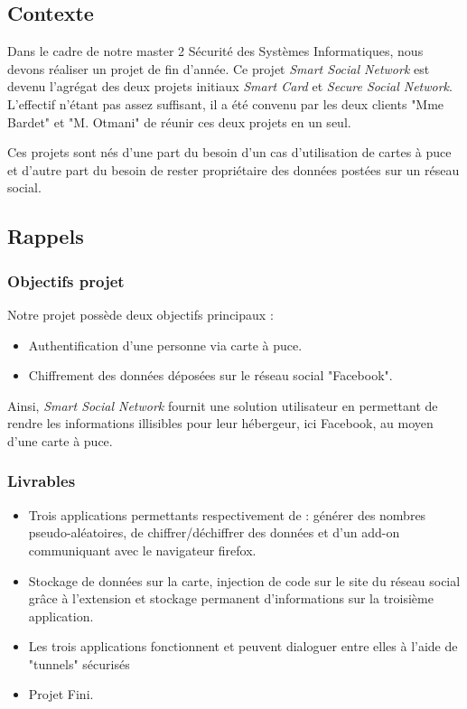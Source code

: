 \documentclass[a4paper,11pt,french]{article}
\begin{document}
\subsection{Contexte}
	Dans le cadre de notre master 2 Sécurité des Systèmes Informatiques,
nous devons réaliser un projet de fin d'année. Ce projet \emph{Smart Social
Network} est devenu l'agrégat des deux projets initiaux \emph{Smart Card} et
\emph{Secure Social Network}. L'effectif n'étant pas assez suffisant, il a
été convenu par les deux clients "Mme Bardet" et "M. Otmani" de réunir ces
deux projets en un seul.


	Ces projets sont nés d'une part du besoin d'un cas d'utilisation de
cartes à puce et d'autre part du besoin de rester propriétaire des données
postées sur un réseau social.


\subsection{Rappels}
\subsubsection{Objectifs projet}
	Notre projet possède deux objectifs principaux :
\begin{itemize}
	\item Authentification d'une personne via carte à puce.
	\item Chiffrement des données déposées sur le réseau social
"Facebook".
\end{itemize}

	Ainsi, \emph{Smart Social Network} fournit une solution utilisateur
en permettant de rendre les informations illisibles pour leur hébergeur, ici
Facebook, au moyen d'une carte à puce.

\subsubsection{Livrables}
\begin{itemize}
	\item Trois applications permettants respectivement de : générer des
nombres pseudo-aléatoires, de chiffrer/déchiffrer des données et d'un add-on
communiquant avec le navigateur firefox.
	\item Stockage de données sur la carte, injection de code sur le site
du réseau social grâce à l'extension et stockage permanent d'informations sur
la troisième application.
	\item Les trois applications fonctionnent et peuvent dialoguer entre
elles à l'aide de "tunnels" sécurisés
	\item Projet Fini.
\end{itemize}
\end{document}
